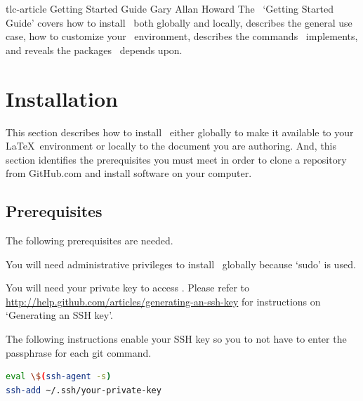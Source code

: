 \documentclass[12pt]{tlc-article}
\begin{document}

\tlcTitlePageAndTableOfContents
  {tlc-article Getting Started Guide}
  {Gary Allan Howard}
  {The \tlcA\ `Getting Started Guide' covers how to install \tlcA\ both globally
   and locally, describes the general use case, how to customize your \tlcA\
   environment, describes the commands \tlcA\ implements, and reveals the
   packages \tlcA\ depends upon.}


\section{Installation}
This section describes how to install \tlcA\ either globally to make it
available to your \LaTeX\ environment or locally to the document you are
authoring.  And, this section identifies the prerequisites you must meet in
order to clone a repository from GitHub.com and install software on your
computer.


\subsection{Prerequisites}
The following prerequisites are needed.
\begin{description}[style=nextline]
  \item[Administrative privilege] You will need administrative privileges to
    install \tlcA\ globally because `sudo' is used.

  \item[SSH key] You will need your private key to access \gitHub.  Please refer
    to \url{http://help.github.com/articles/generating-an-ssh-key} for
    instructions on `Generating an SSH key'.

  \item[Enable your SSH key] The following instructions enable your SSH key so
    you to not have to enter the passphrase for each git command.
\end{description}

\begin{lstlisting}[language=bash]
eval \$(ssh-agent -s)
ssh-add ~/.ssh/your-private-key
\end{lstlisting}
\end{document}
